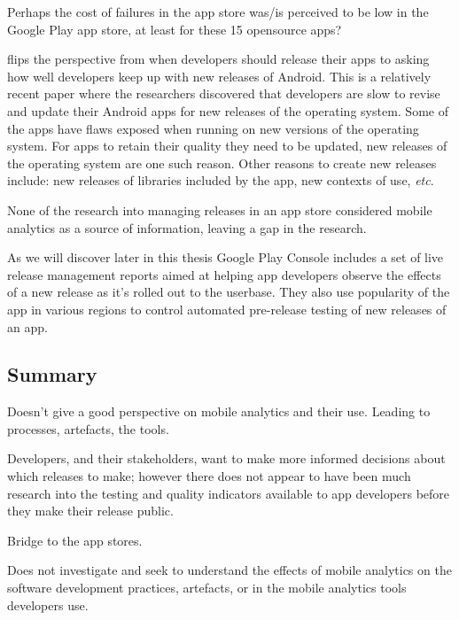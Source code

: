 Perhaps the cost of failures in the app store was/is perceived to be low in the Google Play app store, at least for these 15 opensource apps?

 flips the perspective from when developers should release their apps to asking how well developers keep up with new releases of Android. This is a relatively recent paper where the researchers discovered that developers are slow to revise and update their Android apps for new releases of the operating system. Some of the apps have flaws exposed when running on new versions of the operating system. For apps to retain their quality they need to be updated, new releases of the operating system are one such reason. Other reasons to create new releases include: new releases of libraries included by the app, new contexts of use, \emph{etc}.

None of the research into managing releases in an app store considered mobile analytics as a source of information, leaving a gap in the research.

As we will discover later in this thesis Google Play Console includes a set of live release management reports aimed at helping app developers observe the effects of a new release as it's rolled out to the userbase. They also use popularity of the app in various regions to control automated pre-release testing of new releases of an app.%

\subsection{Summary} %
Doesn't give a good perspective on mobile analytics and their use. Leading to processes, artefacts, the tools.

Developers, and their stakeholders, want to make more informed decisions about which releases to make; however there does not appear to have been much research into the testing and quality indicators available to app developers before they make their release public. 

Bridge to the app stores. 

Does not investigate and seek to understand the effects of mobile analytics on the software development practices, artefacts, or in the mobile analytics tools developers use. 


